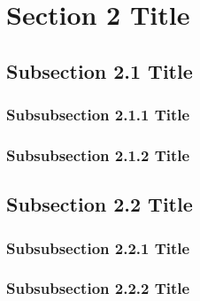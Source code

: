 \section{Section 2 Title}

\subsection{Subsection 2.1 Title}

\subsubsection{Subsubsection 2.1.1 Title}

\subsubsection{Subsubsection 2.1.2 Title}

\subsection{Subsection 2.2 Title}

\subsubsection{Subsubsection 2.2.1 Title}

\subsubsection{Subsubsection 2.2.2 Title}